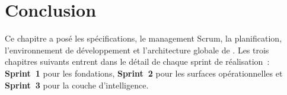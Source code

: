 

\section{Conclusion}
Ce chapitre a posé les spécifications, le management Scrum, la
planification, l'environnement de développement et l'architecture
globale de \nova. Les trois chapitres suivants entrent dans le
détail de chaque sprint de réalisation~: \textbf{Sprint~1} pour les
fondations, \textbf{Sprint~2} pour les surfaces opérationnelles et
\textbf{Sprint~3} pour la couche d'intelligence.

